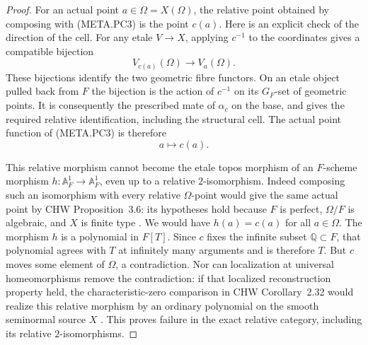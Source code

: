 \begin{proof}
For an actual point $a\in\Omega=X(\Omega)$,
the relative point obtained by composing with
(META.PC3) is the point $c(a)$.
Here is an explicit check of the direction of the cell.
For any etale $V\to X$, applying $c^{-1}$ to the
coordinates gives a compatible bijection
\[
                    V_{c(a)}(\Omega)\longrightarrow V_a(\Omega).
\]
These bijections identify the two geometric fibre
functors.  On an etale object pulled back from $F$
the bijection is the action of $c^{-1}$ on its
$G_F$-set of geometric points.
It is consequently the prescribed mate of $\alpha_c$
on the base, and gives the required relative
identification, including the structural cell.
The actual point function of (META.PC3) is therefore
\[
                              a\longmapsto c(a).                \tag{META.PC4}
\]

This relative morphism cannot become the etale
topos morphism of an $F$-scheme morphism
$h:\mathbb A^1_F\to\mathbb A^1_F$, even up to a
relative $2$-isomorphism.
Indeed composing such an isomorphism with every
relative $\Omega$-point would give the same actual
point by CHW Proposition~3.6: its hypotheses hold
because $F$ is perfect, $\Omega/F$ is algebraic,
and $X$ is finite type \citep[Proposition~3.6]{AN_CHW2024}.
We would have $h(a)=c(a)$ for all $a\in\Omega$.
The morphism $h$ is a polynomial in $F[T]$.
Since $c$ fixes the infinite subset $\mathbb Q\subset F$,
that polynomial agrees with $T$ at infinitely many
arguments and is therefore $T$.
But $c$ moves some element of $\Omega$, a contradiction.
Nor can localization at universal homeomorphisms
remove the contradiction: if that localized
reconstruction property held, the characteristic-zero
comparison in CHW Corollary~2.32 would realize
this relative morphism by an ordinary polynomial
on the smooth seminormal source $X$
\citep[Corollary~2.32]{AN_CHW2024}.
This proves failure in the exact relative category,
including its relative $2$-isomorphisms.


\end{proof}
